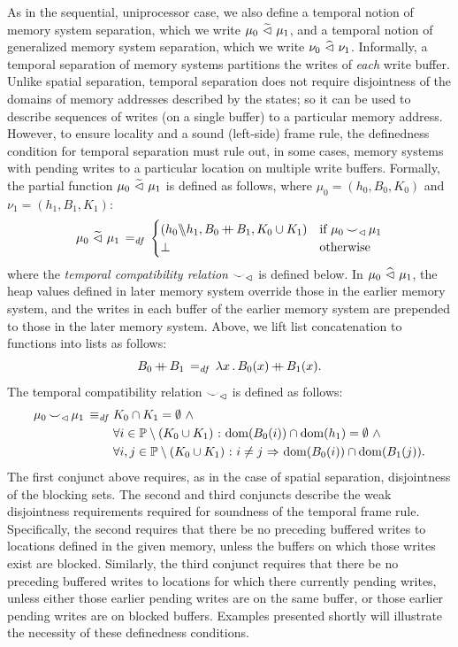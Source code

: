 \documentclass[11pt]{report}
\begin{document}
As in the sequential, uniprocessor case, we also define a temporal notion of memory system separation, which we write $\mu_0 \operatorname{\,\widetilde{\vartriangleleft}\,} \mu_1$, and a temporal notion of generalized memory system separation, which we write $\nu_0 \operatorname{\,\widehat{\vartriangleleft}\,} \nu_1$. Informally, a temporal separation of memory systems partitions the writes of \emph{each} write buffer. Unlike spatial separation, temporal separation does not require disjointness of the domains of memory addresses described by the states; so it can be used to describe sequences of writes (on a single buffer) to a particular memory address. However, to ensure locality and a sound (left-side) frame rule, the definedness condition for temporal separation must rule out, in some cases, memory systems with pending writes to a particular location on multiple write buffers. Formally, the partial function $\mu_0 \operatorname{\,\widetilde{\vartriangleleft}\,} \mu_1$ is defined as follows, where $\mu_0 = (h_0,B_0,K_0)$ and $\nu_1 = (h_1,B_1,K_1)$:
\[ \mu_0 \operatorname{\,\widetilde{\vartriangleleft}\,} \mu_1 \operatorname{\;=_{\mathit{df}}\;} \begin{cases}
  (h_0 \backslash\!\!\backslash h_1, B_0 \operatorname{+\!\!\!+} B_1, K_0 \cup K_1) & \text{if $\mu_0 \operatorname{\smile}_\vartriangleleft \mu_1$} \\ 
  \bot & \text{otherwise}
\end{cases}\] where the \emph{temporal compatibility relation} $\operatorname{\smile}_\vartriangleleft$ is defined below. In $\mu_0 \operatorname{\,\widehat{\vartriangleleft}\,} \mu_1$, the heap values defined in later memory system override those in the earlier memory system, and the writes in each buffer of the earlier memory system are prepended to those in the later memory system. Above, we lift list concatenation to functions into lists as follows: \[ B_0 \operatorname{+\!\!\!+} B_1 \operatorname{\;=_{\mathit{df}}\;} \lambda x\,.\, B_0(x) \operatorname{+\!\!\!+} B_1(x).\]
The temporal compatibility relation $\operatorname{\smile}_\vartriangleleft$ is defined as follows: 
\begin{align*}
\mu_0 \operatorname{\smile}_\vartriangleleft \mu_1 \operatorname{\;\equiv_{\mathit{df}}\;} & K_0 \cap K_1 = \operatorname{\emptyset} \operatorname{\,\wedge\,} \\ 
  & \forall i \in \mathbb{P} \setminus (K_0 \cup K_1) \operatorname{\,:\,} \operatorname{\mathrm{dom}}(B_0(i)) \cap \operatorname{\mathrm{dom}}(h_1) = \operatorname{\emptyset} \operatorname{\,\wedge\,} \\  
  & \forall i,j \in \mathbb{P} \setminus (K_0 \cup K_1) \operatorname{\,:\,} i \neq j \operatorname{\,\Rightarrow\,} \operatorname{\mathrm{dom}}(B_0(i)) \cap \operatorname{\mathrm{dom}}(B_1(j)). 
\end{align*} The first conjunct above requires, as in the case of spatial separation, disjointness of the blocking sets. The second and third conjuncts describe the weak disjointness requirements required for soundness of the temporal frame rule. Specifically, the second requires that there be no preceding buffered writes to locations defined in the given memory, unless the buffers on which those writes exist are blocked. Similarly, the third conjunct requires that there be no preceding buffered writes to locations for which there currently pending writes, unless either those earlier pending writes are on the same buffer, or those earlier pending writes are on blocked buffers. Examples presented shortly will illustrate the necessity of these definedness conditions. 
\end{document}
